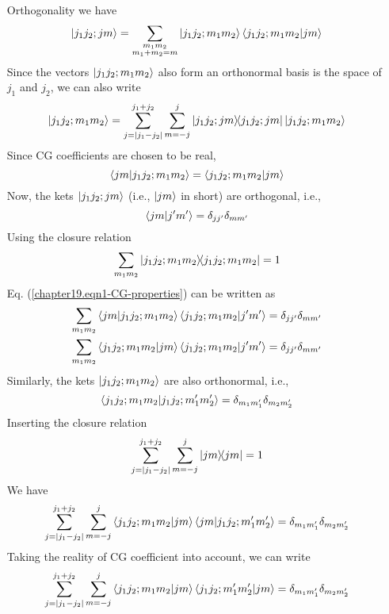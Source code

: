 \begin{enumerate}
	\item[Orthogonality] we have
	\begin{equation}
	\ket{j_1 j_2; j m} = \sum_{\substack{m_1 m_2 \\ m_1 + m_2 = m}} \ket{j_1 j_2; m_1 m_2} \braket{j_1 j_2; m_1 m_2}{j m}
	\end{equation}
	Since the vectors $\ket{j_1 j_2; m_1 m_2}$ also form an orthonormal basis is the space of $j_1$ and $j_2$, we can also write 
	\begin{equation}
	\ket{j_1 j_2; m_1 m_2} = \sum_{j=\abs{j_1 - j_2}}^{j_1 + j_2} \sum_{m=-j}^{j} \ketbra{j_1 j_2; j m}{j_1 j_2; j m} \ket{j_1 j_2; m_1 m_2}
	\end{equation}
	Since CG coefficients are chosen to be real,
	\begin{equation}
		\braket{j m}{j_1 j_2; m_1 m_2} = \braket{j_1 j_2; m_1 m_2}{j m} 
	\end{equation}
	Now, the kets $\ket{j_1 j_2; j m}$ (i.e., $\ket{j m}$ in short) are orthogonal, i.e.,
	\begin{equation}
	\label{chapter19.eqn1-CG-properties}
	\braket{j m}{j^\prime m^\prime} = \delta_{j j^\prime}\delta_{m m^\prime}
	\end{equation}
	Using the closure relation
	\begin{equation*}
	\sum_{m_1 m_2} \ketbra{j_1 j_2; m_1 m_2}{j_1 j_2; m_1 m_2}  = 1
	\end{equation*}
	Eq. (\ref{chapter19.eqn1-CG-properties}) can be written as
	\begin{align}
	\sum_{m_1 m_2} \braket{j m}{j_1 j_2; m_1 m_2} \braket{j_1 j_2; m_1 m_2}{j^\prime m^\prime} &= \delta_{j j^\prime} \delta_{m m^\prime} \nonumber\\
	\label{chapter19.eqn2-CG-properties}
	\sum_{m_1 m_2}\braket{j_1 j_2; m_1 m_2}{j m}  \braket{j_1 j_2; m_1 m_2}{j^\prime m^\prime} &= \delta_{j j^\prime} \delta_{m m^\prime}
	\end{align}
	Similarly, the kets $\ket{j_1 j_2; m_1 m_2}$ are also orthonormal, i.e.,
	\begin{equation*}
	\braket{j_1 j_2; m_1 m_2}{j_1 j_2; m_1^\prime m_2^\prime} = \delta_{m_1 m_1^\prime} \delta_{m_2 m_2^\prime}
	\end{equation*}
	Inserting the closure relation
	\begin{equation*}
	\sum_{j=\abs{j_1 - j_2}}^{j_1 + j_2} \sum_{m=-j}^{j} \ketbra{j m}{j m} = 1
	\end{equation*}
	We have
	\begin{equation*}
	\sum_{j=\abs{j_1 - j_2}}^{j_1 + j_2} \sum_{m=-j}^{j} \braket{j_1 j_2; m_1 m_2}{j m}\braket{j m}{j_1 j_2; m_1^\prime m_2^\prime} = \delta_{m_1 m_1^\prime} \delta_{m_2 m_2^\prime}
	\end{equation*}
	Taking the reality of CG coefficient into account, we can write
	\begin{equation}
	\label{chapter19.eqn3-CG-properties}
		\sum_{j=\abs{j_1 - j_2}}^{j_1 + j_2} \sum_{m=-j}^{j} \braket{j_1 j_2; m_1 m_2}{j m}\braket{j_1 j_2; m_1^\prime m_2^\prime}{j m} = \delta_{m_1 m_1^\prime} \delta_{m_2 m_2^\prime}
	\end{equation}
\end{enumerate}




